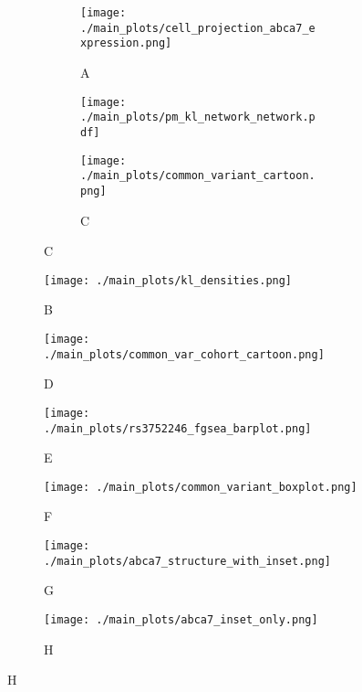\begin{figure}[H]
    \captionsetup[subfigure]{labelformat=empty}
    \begin{subfigure}[t]{0.47\textwidth}
        \begin{subfigure}[t]{0.49\textwidth}
            \caption{A}
            \texttt{[image: ./main\_plots/cell\_projection\_abca7\_expression.png]}        
        \end{subfigure}
        \begin{subfigure}[t]{0.49\textwidth}
            \vspace{1cm}
            \texttt{[image: ./main\_plots/pm\_kl\_network\_network.pdf]}        
        \end{subfigure}
        \begin{subfigure}[t]{\textwidth}
            \caption{C}
            \texttt{[image: ./main\_plots/common\_variant\_cartoon.png]}        
        \end{subfigure}
    \end{subfigure}
    \begin{subfigure}[t]{0.45\textwidth}
        \caption{B}
        \texttt{[image: ./main\_plots/kl\_densities.png]}        
    \end{subfigure}
    \begin{subfigure}[t]{0.3\textwidth}
        \caption{D}
        \texttt{[image: ./main\_plots/common\_var\_cohort\_cartoon.png]}        
    \end{subfigure}
    \hspace{0.01\textwidth} %
    \begin{subfigure}[t]{0.225\textwidth}
        \caption{E}
        \texttt{[image: ./main\_plots/rs3752246\_fgsea\_barplot.png]}        
    \end{subfigure}
    \begin{subfigure}[t]{0.45\textwidth}
        \caption{F}
        \texttt{[image: ./main\_plots/common\_variant\_boxplot.png]}        
    \end{subfigure}
    \begin{subfigure}[t]{0.3\textwidth}
        \caption{G}
        \texttt{[image: ./main\_plots/abca7\_structure\_with\_inset.png]}        
    \end{subfigure}
    \begin{subfigure}[t]{0.165\textwidth}
        \caption{H}
        \texttt{[image: ./main\_plots/abca7\_inset\_only.png]}        

\end{subfigure}
\end{figure}
